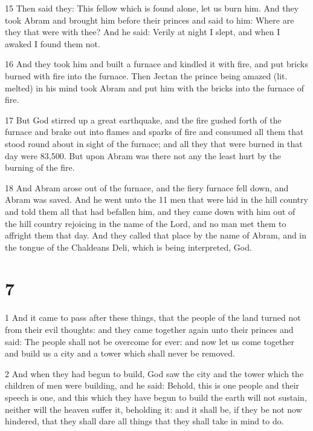 \par 15 Then said they: This fellow which is found alone, let us burn him. And they took Abram and brought him before their princes and said to him: Where are they that were with thee? And he said: Verily at night I slept, and when I awaked I found them not.

\par 16 And they took him and built a furnace and kindled it with fire, and put bricks burned with fire into the furnace. Then Jectan the prince being amazed (lit. melted) in his mind took Abram and put him with the bricks into the furnace of fire. 

\par 17 But God stirred up a great earthquake, and the fire gushed forth of the furnace and brake out into flames and sparks of fire and consumed all them that stood round about in sight of the furnace; and all they that were burned in that day were 83,500. But upon Abram was there not any the least hurt by the burning of the fire.

\par 18 And Abram arose out of the furnace, and the fiery furnace fell down, and Abram was saved. And he went unto the 11 men that were hid in the hill country and told them all that had befallen him, and they came down with him out of the hill country rejoicing in the name of the Lord, and no man met them to affright them that day. And they called that place by the name of Abram, and in the tongue of the Chaldeans Deli, which is being interpreted, God.



\chapter{7}

\par 1 And it came to pass after these things, that the people of the land turned not from their evil thoughts: and they came together again unto their princes and said: The people shall not be overcome for ever: and now let us come together and build us a city and a tower which shall never be removed.

\par 2 And when they had begun to build, God saw the city and the tower which the children of men were building, and he said: Behold, this is one people and their speech is one, and this which they have begun to build the earth will not sustain, neither will the heaven suffer it, beholding it: and it shall be, if they be not now hindered, that they shall dare all things that they shall take in mind to do.

